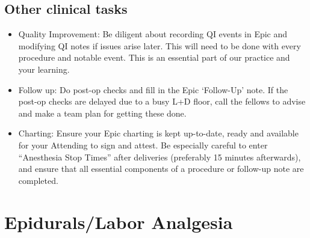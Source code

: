 \documentclass[twoside,8pt]{extarticle}
\providecommand{\tightlist}{%
}
\begin{document}
\subsection{Other clinical tasks}\label{other-clinical-tasks-1}

\begin{itemize}
\tightlist
\item
  Quality Improvement: Be diligent about recording QI events in Epic and
  modifying QI notes if issues arise later. This will need to be done
  with every procedure and notable event. This is an essential part of
  our practice and your learning.
\item
  Follow up: Do post-op checks and fill in the Epic `Follow-Up' note. If
  the post-op checks are delayed due to a busy L+D floor, call the
  fellows to advise and make a team plan for getting these done.
\item
  Charting: Ensure your Epic charting is kept up-to-date, ready and
  available for your Attending to sign and attest. Be especially careful
  to enter ``Anesthesia Stop Times'' after deliveries (preferably 15
  minutes afterwards), and ensure that all essential components of a
  procedure or follow-up note are completed.
\end{itemize}

\section{Epidurals/Labor Analgesia}\label{epiduralslabor-analgesia-2}
\end{document}
